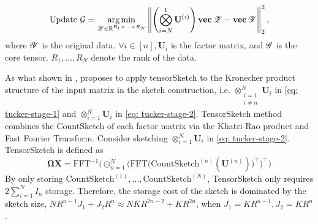 \begin{equation}\label{eq: tucker-stage-2}
\text{Update } \mathcal{G}=\underset{\T{Z} \in \mathbb{R}^{R_{1} \times \cdots \times R_{N}}}{\arg \min } \left\|\left(\bigotimes_{i=N}^{1} \mathbf{U}^{(i)}\right) \vc{\T{Z}}-\vc{\T{Y}}   \right\|_{2}^{2},
\end{equation}
where $\T{Y}$ is the original data. $\forall i \in [n], \mathbf{U}_i$ is the factor matrix, and $\T{G}$ is the core tensor. $R_1, \dots, R_N$ denote the rank of the data. 

As what shown in \cite{cormode2008finding}, 
\cite{malik2018low} proposes to apply tensorSketch  to the Kronecker product structure of the input matrix in the sketch construction, i.e. $\otimes_{\substack{i = 1\\ i \neq n}}^N \mathbf{U}_i$ in \ref{eq: tucker-stage-1} and $\otimes_{i =1}^N \mathbf{U}_i$ in \ref{eq: tucker-stage-2}. TensorSketch method combines the CountSketch of each factor matrix via the Khatri-Rao product and Fast Fourier Transform.
Consider sketching $\otimes_{i =1}^N \mathbf{U}_i$ in \ref{eq: tucker-stage-2}. TensorSketch is defined as
\begin{equation}\label{eq:tensorsketch}
\mathbf{\Omega}\mathbf{X}= \text{FFT}^{-1 }\bigg(\odot_{n =1}^N \Big(\text{FFT}\big(\text{CountSketch}^{(n)}(\mathbf{U}^{(n)}) \big)^\top \Big)^\top \bigg)
\end{equation}
By only storing $\text{CountSketch}^{(1)}, \dots, \text{CountSketch}^{(N)}$,
TensorSketch only requires $2\sum_{i=1}^N I_n$ storage. Therefore, the storage cost of the sketch is dominated by the sketch size, $NR^{n-1}J_1 + J_2R^n \approx NKR^{2n-2}+KR^{2n}$, when $J_1 = KR^{n-1}, J_2 = KR^n$.
